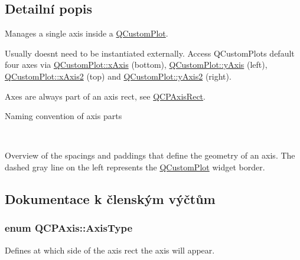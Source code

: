 \subsection{Detailní popis}
Manages a single axis inside a \hyperlink{classQCustomPlot}{Q\+Custom\+Plot}. 

Usually doesn\textquotesingle{}t need to be instantiated externally. Access Q\+Custom\+Plot\textquotesingle{}s default four axes via \hyperlink{classQCustomPlot_a9a79cd0158a4c7f30cbc702f0fd800e4}{Q\+Custom\+Plot\+::x\+Axis} (bottom), \hyperlink{classQCustomPlot_af6fea5679725b152c14facd920b19367}{Q\+Custom\+Plot\+::y\+Axis} (left), \hyperlink{classQCustomPlot_ada41599f22cad901c030f3dcbdd82fd9}{Q\+Custom\+Plot\+::x\+Axis2} (top) and \hyperlink{classQCustomPlot_af13fdc5bce7d0fabd640f13ba805c0b7}{Q\+Custom\+Plot\+::y\+Axis2} (right).

Axes are always part of an axis rect, see \hyperlink{classQCPAxisRect}{Q\+C\+P\+Axis\+Rect}.  \begin{center}Naming convention of axis parts\end{center}  ~\newline
  \begin{center}Overview of the spacings and paddings that define the geometry of an axis. The dashed gray line on the left represents the \hyperlink{classQCustomPlot}{Q\+Custom\+Plot} widget border.\end{center}  

\subsection{Dokumentace k členským výčtům}
\hypertarget{classQCPAxis_ae2bcc1728b382f10f064612b368bc18a}{}
\subsubsection[{Axis\+Type}]{\setlength{\rightskip}{0pt plus 5cm}enum {\bf Q\+C\+P\+Axis\+::\+Axis\+Type}}\label{classQCPAxis_ae2bcc1728b382f10f064612b368bc18a}


Defines at which side of the axis rect the axis will appear. 

